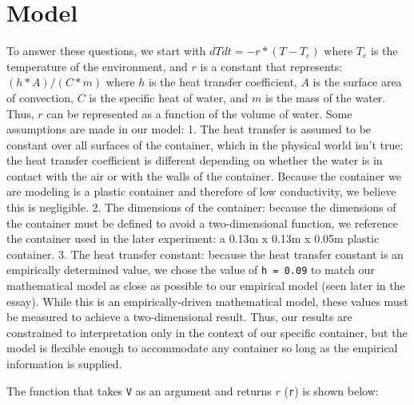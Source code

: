 \documentclass[11pt]{article}
\begin{document}
\hypertarget{model}{%
\section{Model}\label{model}}

To answer these questions, we start with \(dTdt = -r * (T - T_e)\) where
\(T_e\) is the temperature of the environment, and \(r\) is a constant
that represents: \((h*A)/(C*m)\) where \(h\) is the heat transfer
coefficient, \(A\) is the surface area of convection, \(C\) is the
specific heat of water, and \(m\) is the mass of the water. Thus, \(r\)
can be represented as a function of the volume of water. Some
assumptions are made in our model: 1. The heat transfer is assumed to be
constant over all surfaces of the container, which in the physical world
isn't true: the heat transfer coefficient is different depending on
whether the water is in contact with the air or with the walls of the
container. Because the container we are modeling is a plastic container
and therefore of low conductivity, we believe this is negligible. 2. The
dimensions of the container: because the dimensions of the container
must be defined to avoid a two-dimensional function, we reference the
container used in the later experiment: a 0.13m x 0.13m x 0.05m plastic
container. 3. The heat transfer constant: because the heat transfer
constant is an empirically determined value, we chose the value of
\texttt{h\ =\ 0.09} to match our mathematical model as close as possible
to our empirical model (seen later in the essay). While this is an
empirically-driven mathematical model, these values must be measured to
achieve a two-dimensional result. Thus, our results are constrained to
interpretation only in the context of our specific container, but the
model is flexible enough to accommodate any container so long as the
empirical information is supplied.

The function that takes \texttt{V} as an argument and returns \(r\)
(\texttt{r}) is shown below:
\end{document}

